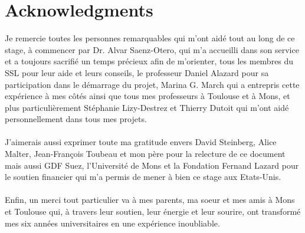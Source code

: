 \section*{Acknowledgments}
Je remercie toutes les personnes remarquables qui m'ont aid\'{e} tout au long de ce stage, \`{a} commencer par Dr. Alvar Saenz-Otero, qui m'a accueilli dans son service et a toujours sacrifi\'{e} un temps pr\'{e}cieux afin de m'orienter, tous les membres du SSL pour leur aide et leurs conseils, le professeur Daniel Alazard pour sa participation dans le d\'{e}marrage du projet, Marina G. March qui a entrepris cette exp\'{e}rience \`{a} mes c\^{o}t\'{e}s ainsi que tous mes professeurs \`{a} Toulouse et \`{a} Mons, et plus particuli\`{e}rement St\'{e}phanie Lizy-Destrez et Thierry Dutoit qui m'ont aid\'{e} personnellement dans tous mes projets.\\\\
J'aimerais aussi exprimer toute ma gratitude envers David Steinberg, Alice Malter, Jean-Fran\c{c}ois Toubeau et mon p\`{e}re pour la relecture de ce document mais aussi GDF Suez, l'Universit\'{e} de Mons et la Fondation Fernand Lazard pour le soutien financier qui m'a permis de mener \`{a} bien ce stage aux Etats-Unis.\\\\
Enfin, un merci tout particulier va \`{a} mes parents, ma soeur et mes amis \`{a} Mons et Toulouse qui, \`{a} travers leur soutien, leur \'{e}nergie et leur sourire, ont transform\'{e} mes six ann\'{e}es universitaires en une exp\'{e}rience inoubliable.

